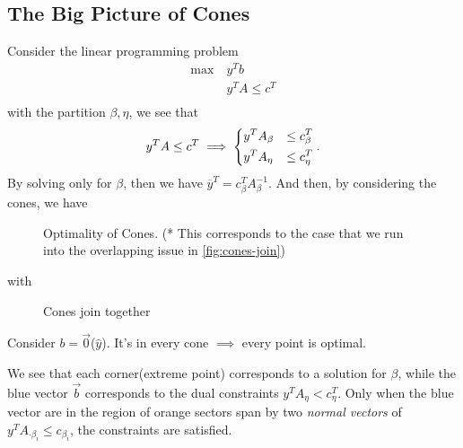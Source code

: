 \subsection{The Big Picture of Cones}
Consider the linear programming problem
\begin{align*}
	\max~ & y^{T} b            \\
	      & y^{T} A \leq c^{T} \\
\end{align*}
with the partition \(\beta, \eta\), we see that
\[
	y^{T} A \leq c^{T} \implies \begin{dcases}
		y^{T} A_{\beta} & \leq c^{T}_{\beta} \\
		y^{T} A_{\eta}  & \leq c^{T}_{\eta}
	\end{dcases}.
\]
By solving only for \(\beta\), then we have \(\overline{y}^{T} = c_{\beta}^{T} A^{-1}_{\beta}\). And then, by considering the cones, we have

\begin{figure}[H]
	\centering
	\caption{Optimality of Cones. (* This corresponds to the case that we run into the overlapping issue in \autoref{fig:cones-join})}
	\label{fig:opt-cones}
\end{figure}
with
\begin{figure}[H]
	\centering
	\caption{Cones join together}
	\label{fig:cones-join}
\end{figure}

\begin{note}
	Consider \(b = \vec{0}\)(\(\hat{y}\)). It's in every cone \(\implies\) every point is optimal.
\end{note}

\begin{remark}
	We see that each corner(extreme point) corresponds to a solution for \(\beta\), while the blue vector \(\vec{b}\) corresponds to the dual constraints
	\(y^{T} A_{\eta}<c_{\eta}^{T}\). Only when the blue vector are in the region of orange sectors span by two \emph{normal vectors} of
	\(y^{T}A_{\cdot \beta_i}\leq c_{\beta_i}\), the constraints are satisfied.
\end{remark}

